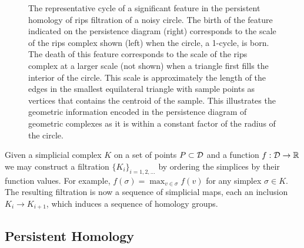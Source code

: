 \begin{figure}[htbp]
    \caption{The representative cycle of a significant feature in the persistent homology of rips filtration of a noisy circle.
            The birth of the feature indicated on the persistence diagram (right) corresponds to the scale of the rips complex shown (left) when the circle, a 1-cycle, is born.
            The death of this feature corresponds to the scale of the rips complex at a larger scale (not shown) when a triangle first fills the interior of the circle.
            This scale is approximately the length of the edges in the smallest equilateral triangle with sample points as vertices that contains the centroid of the sample.
            This illustrates the geometric information encoded in the persistence diagram of geometric complexes as it is within a constant factor of the radius of the circle.}
    \label{fig:cycle_diagrams}
\end{figure}

Given a simplicial complex $K$ on a set of points $P\subset{\mathcal{D}}$ and a function $f:{\mathcal{D}}\to\mathbb{R}$ we may construct a filtration $\{K_i\}_{i=1,2,\ldots}$ by ordering the simplices by their function values.
For example, $f(\sigma) = \max_{v\in\sigma} f(v)$ for any simplex $\sigma\in K$.
The resulting filtration is now a sequence of simplicial maps, each an inclusion $K_i\to K_{i+1}$, which induces a sequence of homology groups.

\subsection{Persistent Homology}


